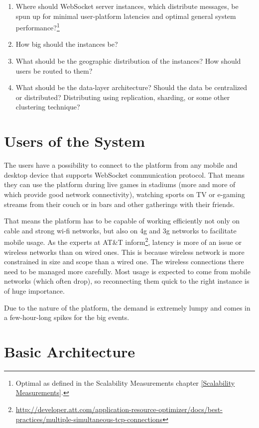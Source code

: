 \documentclass{uvamscse}
\begin{document}
\begin{enumerate}
  \item Where should WebSocket server instances, which distribute messages, be spun up for minimal user-platform latencies and optimal general system performance?\footnote{Optimal as defined in the Scalability Measurements chapter \ref{Scalability Measurements}.}
  \item How big should the instances be?
  \item What should be the geographic distribution of the instances? How should users be routed to them?
  \item What should be the data-layer architecture? Should the data be centralized or distributed? Distributing using replication, sharding, or some other clustering technique?
\end{enumerate}

\section{Users of the System}

The users have a possibility to connect to the platform from any mobile and desktop device that supports WebSocket communication protocol. That means they can use the platform during live games in stadiums (more and more of which provide good network connectivity), watching sports on TV or e-gaming streams from their couch or in bars and other gatherings with their friends.

That means the platform has to be capable of working efficiently not only on cable and strong wi-fi networks, but also on 4g and 3g networks to facilitate mobile usage. As the experts at AT\&T inform\footnote{\url{http://developer.att.com/application-resource-optimizer/docs/best-practices/multiple-simultaneous-tcp-connections}}, latency is more of an issue or wireless networks than on wired ones. This is because wireless network is more constrained in size and scope than a wired one. The wireless connections there need to be managed more carefully. Most usage is expected to come from mobile networks (which often drop), so reconnecting them quick to the right instance is of huge importance.

Due to the nature of the platform, the demand is extremely lumpy and comes in a few-hour-long spikes for the big events.

\section{Basic Architecture}
\end{document}
